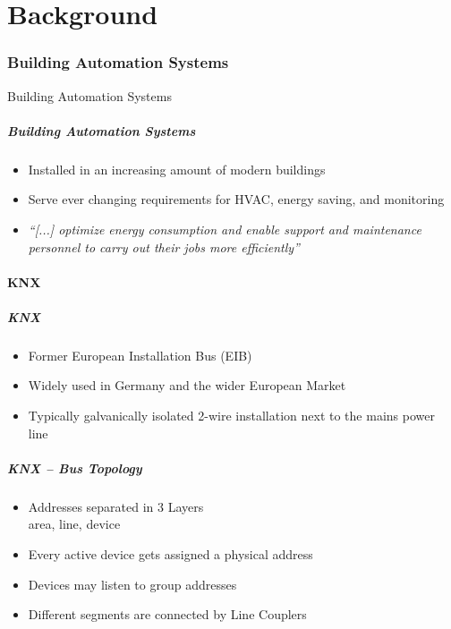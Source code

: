 \part{Background}
\label{part:back}

\section{Building Automation Systems}
\begin{frame}[c]
	\centering
	\LARGE Building Automation Systems
\end{frame}

\begin{frame}[c]
	\frametitle{Building Automation Systems}
	\begin{itemize}
		\item Installed in an increasing amount of modern buildings
		\item Serve ever changing requirements for HVAC, energy saving, and monitoring
		\item \textit{\enquote{[...] optimize energy consumption and enable support and maintenance personnel to carry out their jobs more efficiently}} \parencite{Merz2009}
	\end{itemize}
	
	\note{}
\end{frame}

\subsection{KNX}
\begin{frame}[c]
	\frametitle{KNX}
	\begin{itemize}
		\item Former European Installation Bus (EIB)
		\item Widely used in Germany and the wider European Market
		\item Typically galvanically isolated 2-wire installation next to the mains power line
	\end{itemize}

\end{frame}

\begin{frame}[c]
	\frametitle{KNX -- Bus Topology}
	\begin{itemize}
		\item Addresses separated in 3 Layers\\area, line, device
		\item Every active device gets assigned a physical address
		\item Devices may listen to group addresses
		\item Different segments are connected by Line Couplers
	\end{itemize}
\end{frame}

